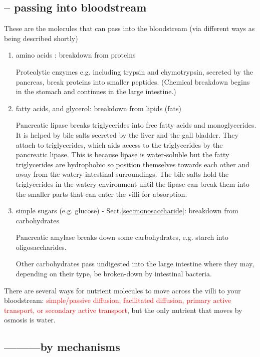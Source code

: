 \subsection{-- passing into bloodstream}
\label{sec:villi-passing-small-molecules}

These are the molecules that can pass into the bloodstream (via different ways
as being described shortly)
\begin{enumerate}
  \item amino acids : breakdown from proteins
  
  Proteolytic enzymes e.g. including trypsin and chymotrypsin, secreted by the
  pancreas, break proteins into smaller peptides. (Chemical breakdown begins in
  the stomach and continues in the large intestine.) 
  
  \item fatty acids, and glycerol: breakdown from lipids (fats)
  
  Pancreatic lipase breaks triglycerides into free fatty acids and monoglycerides. 
It is helped by bile salts secreted by the liver and the gall bladder. They
attach to triglycerides, which aids access to the triglycerides by the
pancreatic lipase. This is because lipase is water-soluble but the fatty
triglycerides are hydrophobic so position themselves towards each other and away
from the watery intestinal surroundings. The bile salts hold the triglycerides
in the watery environment until the lipase can break them into the smaller parts
that can enter the villi for absorption.  

  \item simple sugars (e.g. glucose) - Sect.\ref{sec:monosaccharide}: breakdown
  from carbohydrates

Pancreatic amylase breaks down some carbohydrates, e.g. starch into
oligosaccharides.

Other carbohydrates pass undigested into the large intestine where they may,
depending on their type, be broken-down by intestinal bacteria.

\end{enumerate}


There are several ways for nutrient molecules to move across the villi to your
bloodstream: \textcolor{red}{simple/passive diffusion, facilitated diffusion,
primary active transport, or secondary active transport}, but the only nutrient
that moves by osmosis is water.

\subsection{---------by mechanisms}

